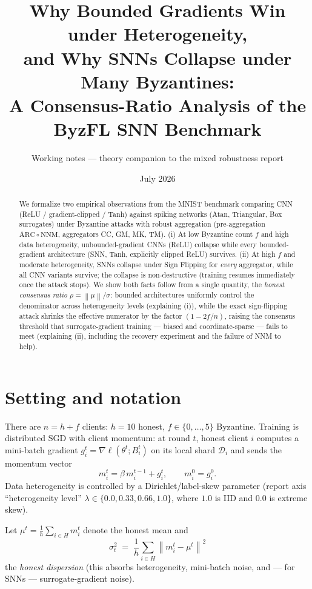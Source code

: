 \documentclass[11pt]{article}
\title{Why Bounded Gradients Win under Heterogeneity,\\
and Why SNNs Collapse under Many Byzantines:\\
\large A Consensus-Ratio Analysis of the ByzFL SNN Benchmark}
\author{Working notes --- theory companion to the mixed robustness report}
\date{July 2026}
\newcommand{\norm}[1]{\left\lVert #1 \right\rVert}
\begin{document}
\maketitle

\begin{abstract}
We formalize two empirical observations from the MNIST benchmark comparing CNN
(ReLU / gradient-clipped / Tanh) against spiking networks (Atan, Triangular,
Box surrogates) under Byzantine attacks with robust aggregation
(pre-aggregation $\mathrm{ARC}\circ\mathrm{NNM}$, aggregators CC, GM, MK, TM).
(i) At low Byzantine count $f$ and high data heterogeneity, unbounded-gradient
CNNs (ReLU) collapse while every bounded-gradient architecture (SNN, Tanh,
explicitly clipped ReLU) survives. (ii) At high $f$ and moderate heterogeneity,
SNNs collapse under Sign Flipping for \emph{every} aggregator, while all CNN
variants survive; the collapse is non-destructive (training resumes immediately
once the attack stops). We show both facts follow from a single quantity, the
\emph{honest consensus ratio} $\rho = \norm{\mu}/\sigma$: bounded architectures
uniformly control the denominator across heterogeneity levels (explaining (i)),
while the exact sign-flipping attack shrinks the effective numerator by the
factor $(1-2f/n)$, raising the consensus threshold that surrogate-gradient
training --- biased and coordinate-sparse --- fails to meet (explaining (ii),
including the recovery experiment and the failure of NNM to help).
\end{abstract}

\section{Setting and notation}

There are $n = h + f$ clients: $h=10$ honest, $f \in \{0,\dots,5\}$ Byzantine.
Training is distributed SGD with client momentum: at round $t$, honest client
$i$ computes a mini-batch gradient $g_i^t = \nabla \ell(\theta^t; B_i^t)$ on its
local shard $\mathcal D_i$ and sends the momentum vector
\begin{equation}
m_i^t = \beta\, m_i^{t-1} + g_i^t, \qquad m_i^0 = g_i^0 .
\end{equation}
Data heterogeneity is controlled by a Dirichlet/label-skew parameter (report
axis ``heterogeneity level'' $\lambda \in \{0.0, 0.33, 0.66, 1.0\}$, where
$1.0$ is IID and $0.0$ is extreme skew).

Let $\mu^t = \tfrac1h \sum_{i\in H} m_i^t$ denote the honest mean and
\begin{equation}
\sigma_t^2 \;=\; \frac1h \sum_{i \in H} \norm{m_i^t - \mu^t}^2
\end{equation}
the \emph{honest dispersion} (this absorbs heterogeneity, mini-batch noise, and
--- for SNNs --- surrogate-gradient noise).
\end{document}
